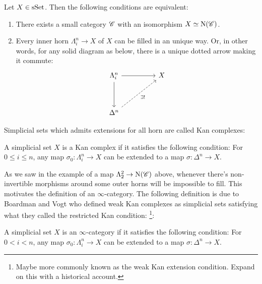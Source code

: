 \documentclass[../thesis.tex]{subfiles}
\begin{document}
\begin{proposition}
    Let $X \in \mathrm{sSet}$.
    Then the following conditions are equivalent:
    \begin{enumerate}
        \item There exists a small category $\mathscr{C}$ with an isomorphism $X \simeq \mathrm{N}(\mathscr{C})$.
        \item Every inner horn $\Lambda_i^n \to X$ of $X$ can be filled in an unique way.
              Or, in other words, for any solid diagram as below, there is a unique dotted arrow making it commute:
              \[\begin{tikzcd}
                      {\Lambda_i^n} && X \\
                      \\
                      {\Delta^n}
                      \arrow[from=1-1, to=1-3]
                      \arrow[from=1-1, to=3-1]
                      \arrow["{\exists!}"', dashed, from=3-1, to=1-3]
                  \end{tikzcd}\]
    \end{enumerate}
\end{proposition}
Simplicial sets which admits extensions for all horn are called Kan complexes:
\begin{definition}
    A simplicial set $X$ is a Kan complex if it satisfies the following condition:
    For $0 \leq i \leq n$, any map $\sigma_0 : \Lambda_i^n \to X$ can be extended to a map $\sigma: \Delta^n \to X$.
\end{definition}
As we saw in the example of a map $\Lambda_2^2\to \mathrm{N}(\mathscr{C})$ above, whenever there's non-invertible morphisms around some outer horns will be impossible to fill.
This motivates the definition of an $\infty$-category.
The following definition is due to Boardman and Vogt \cite{BoardmanVogt} who defined weak Kan complexes as simplicial sets satisfying what they called the restricted Kan condition:
\footnote{Maybe more commonly known as the weak Kan extension condition. Expand on this with a historical account.}:
\begin{definition}
    A simplicial set $X$ is an $\infty$-category if it satisfies the following condition:
    For $0 < i < n$, any map $\sigma_0 : \Lambda_i^n \to X$ can be extended to a map $\sigma: \Delta^n \to X$.
\end{definition}
\end{document}
